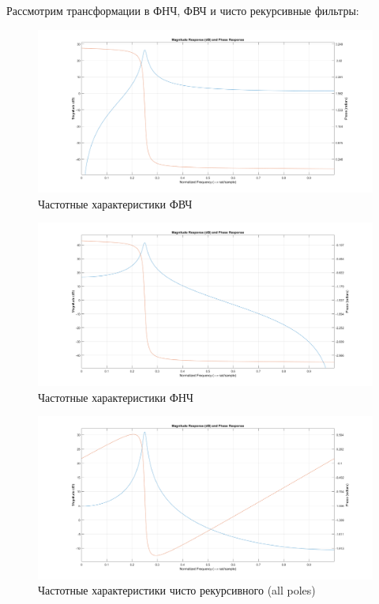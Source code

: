 \documentclass[12pt,a4paper]{article}
\begin{document}
	Рассмотрим трансформации в ФНЧ, ФВЧ и чисто рекурсивные фильтры:

	\begin{figure}[H]
		\centering
		\includegraphics[width=1.0\linewidth]{res/3_2_highpass.png}
		\caption{Частотные характеристики ФВЧ}
	\end{figure}

	\begin{figure}[H]
		\centering
		\includegraphics[width=1.0\linewidth]{res/3_2_lowpass.png}
		\caption{Частотные характеристики ФНЧ}
	\end{figure}
		
	\begin{figure}[H]
		\centering
		\includegraphics[width=1.0\linewidth]{res/3_2_allpoles.png}
		\caption{Частотные характеристики чисто рекурсивного (all poles)}
	\end{figure}
\end{document}
